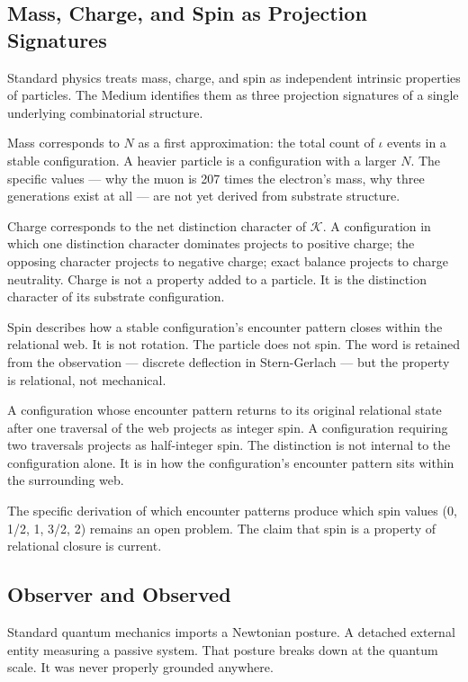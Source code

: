 \documentclass[11pt,letterpaper]{article}
\newcommand{\Kappa}{\mathcal{K}}
\begin{document}
\subsection{Mass, Charge, and Spin as Projection Signatures}
\label{sec:orgeb23650}

Standard physics treats mass, charge, and spin as independent intrinsic properties of particles. The Medium identifies them as three projection signatures of a single underlying combinatorial structure.

Mass corresponds to \(N\) as a first approximation: the total count of \(\iota\) events in a stable configuration. A heavier particle is a configuration with a larger \(N\). The specific values --- why the muon is 207 times the electron's mass, why three generations exist at all --- are not yet derived from substrate structure.

Charge corresponds to the net distinction character of \(\Kappa\). A configuration in which one distinction character dominates projects to positive charge; the opposing character projects to negative charge; exact balance projects to charge neutrality. Charge is not a property added to a particle. It is the distinction character of its substrate configuration.

Spin describes how a stable configuration's encounter pattern closes within the relational web. It is not rotation. The particle does not spin. The word is retained from the observation --- discrete deflection in Stern-Gerlach --- but the property is relational, not mechanical.

A configuration whose encounter pattern returns to its original relational state after one traversal of the web projects as integer spin. A configuration requiring two traversals projects as half-integer spin. The distinction is not internal to the configuration alone. It is in how the configuration's encounter pattern sits within the surrounding web.

The specific derivation of which encounter patterns produce which spin values (0, 1/2, 1, 3/2, 2) remains an open problem. The claim that spin is a property of relational closure is current.

\subsection{Observer and Observed}
\label{sec:org30b0d67}


Standard quantum mechanics imports a Newtonian posture. A detached external entity measuring a passive system. That posture breaks down at the quantum scale. It was never properly grounded anywhere.
\end{document}
